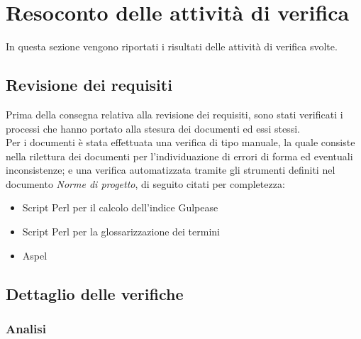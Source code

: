 \section{Resoconto delle attività di verifica}
  In questa sezione vengono riportati i risultati delle attività di verifica svolte.
  \subsection{Revisione dei requisiti}
  Prima della consegna relativa alla revisione dei requisiti, sono stati verificati i processi che hanno portato alla stesura dei documenti ed essi stessi. \\
  Per i documenti è stata effettuata una verifica di tipo manuale, la quale consiste nella rilettura dei documenti per l'individuazione di errori di forma ed eventuali inconsistenze;
  e una verifica automatizzata tramite gli strumenti definiti nel documento \emph{Norme di progetto}, di seguito citati per completezza:
  \begin{itemize}
    \item Script Perl per il calcolo dell’indice Gulpease
    \item Script Perl per la glossarizzazione dei termini
    \item Aspel
  \end{itemize}
  \subsection{Dettaglio delle verifiche}
    \subsubsection{Analisi}

